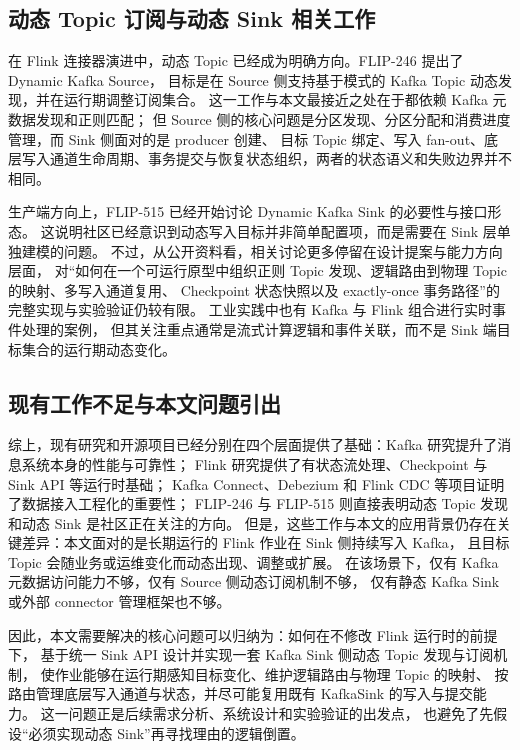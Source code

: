 \subsection{动态 Topic 订阅与动态 Sink 相关工作}

在 Flink 连接器演进中，动态 Topic 已经成为明确方向。FLIP-246 提出了 Dynamic Kafka Source，
目标是在 Source 侧支持基于模式的 Kafka Topic 动态发现，并在运行期调整订阅集合\cite{flip246}。
这一工作与本文最接近之处在于都依赖 Kafka 元数据发现和正则匹配；
但 Source 侧的核心问题是分区发现、分区分配和消费进度管理，而 Sink 侧面对的是 producer 创建、
目标 Topic 绑定、写入 fan-out、底层写入通道生命周期、事务提交与恢复状态组织，两者的状态语义和失败边界并不相同。

生产端方向上，FLIP-515 已经开始讨论 Dynamic Kafka Sink 的必要性与接口形态\cite{flip515}。
这说明社区已经意识到动态写入目标并非简单配置项，而是需要在 Sink 层单独建模的问题。
不过，从公开资料看，相关讨论更多停留在设计提案与能力方向层面，
对“如何在一个可运行原型中组织正则 Topic 发现、逻辑路由到物理 Topic 的映射、多写入通道复用、
Checkpoint 状态快照以及 exactly-once 事务路径”的完整实现与实验验证仍较有限。
工业实践中也有 Kafka 与 Flink 组合进行实时事件处理的案例\cite{saket2024kafkaflink}，
但其关注重点通常是流式计算逻辑和事件关联，而不是 Sink 端目标集合的运行期动态变化。

\subsection{现有工作不足与本文问题引出}

综上，现有研究和开源项目已经分别在四个层面提供了基础：Kafka 研究提升了消息系统本身的性能与可靠性；
Flink 研究提供了有状态流处理、Checkpoint 与 Sink API 等运行时基础；
Kafka Connect、Debezium 和 Flink CDC 等项目证明了数据接入工程化的重要性；
FLIP-246 与 FLIP-515 则直接表明动态 Topic 发现和动态 Sink 是社区正在关注的方向。
但是，这些工作与本文的应用背景仍存在关键差异：本文面对的是长期运行的 Flink 作业在 Sink 侧持续写入 Kafka，
且目标 Topic 会随业务或运维变化而动态出现、调整或扩展。
在该场景下，仅有 Kafka 元数据访问能力不够，仅有 Source 侧动态订阅机制不够，
仅有静态 Kafka Sink 或外部 connector 管理框架也不够。

因此，本文需要解决的核心问题可以归纳为：如何在不修改 Flink 运行时的前提下，
基于统一 Sink API 设计并实现一套 Kafka Sink 侧动态 Topic 发现与订阅机制，
使作业能够在运行期感知目标变化、维护逻辑路由与物理 Topic 的映射、
按路由管理底层写入通道与状态，并尽可能复用既有 KafkaSink 的写入与提交能力。
这一问题正是后续需求分析、系统设计和实验验证的出发点，
也避免了先假设“必须实现动态 Sink”再寻找理由的逻辑倒置。


